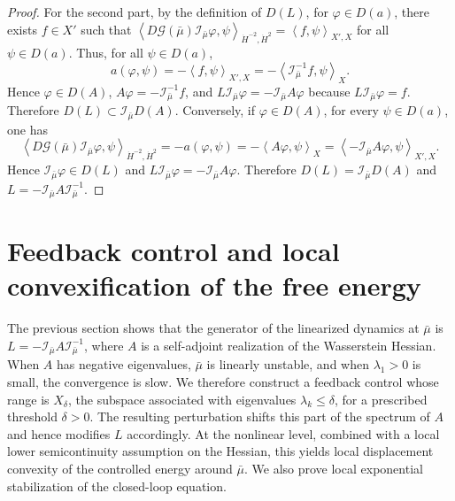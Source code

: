 \documentclass[11pt]{article}
\numberwithin{equation}{section}
\theoremstyle{definition}
\newcommand{\rieszmap}[1][\mu]{\mathcal{I}_{#1}}
\newcommand{\dotHk}[1][k]{\dot{H}^{#1}}
\begin{document}
\begin{proof}
    For the second part, by the definition of $D(L)$, for $\varphi \in D(a)$, there exists $f \in X'$ such that $\left\langle D\mathcal{G}(\bar\mu) \rieszmap[\bar\mu]\varphi, \psi \right\rangle_{\dot{H}^{-2}, \dotHk[2]} = \left\langle f, \psi \right\rangle_{X', X}$ for all $\psi \in D(a)$. 
    Thus, for all $\psi \in D(a)$, 
    \[
    a(\varphi, \psi) = -\left\langle f, \psi \right\rangle_{X', X} = -\left\langle \rieszmap[\bar\mu]^{-1} f, \psi \right\rangle_X.
    \]
    Hence $\varphi \in D(A)$, $A \varphi = -\rieszmap[\bar\mu]^{-1} f$, and $L \rieszmap[\bar\mu]\varphi = -\rieszmap[\bar\mu] A \varphi $ because $L\rieszmap[\bar\mu]\varphi = f$.
    Therefore $D(L) \subset \rieszmap[\bar\mu]D(A) $.
    Conversely, if $\varphi \in D(A)$, for every $\psi \in D(a)$, one has
    \begin{equation*}
        \left\langle D\mathcal{G}(\bar\mu) \rieszmap[\bar\mu]\varphi, \psi \right\rangle_{\dot{H}^{-2}, \dotHk[2]} = -a(\varphi, \psi) = -\left\langle A \varphi, \psi \right\rangle_X = \left\langle -\rieszmap[\bar\mu] A \varphi, \psi \right\rangle_{X', X}.
    \end{equation*}
    Hence $\rieszmap[\bar\mu]\varphi \in D(L)$ and $L \rieszmap[\bar\mu]\varphi = -\rieszmap[\bar\mu] A \varphi$. 
    Therefore $D(L) = \rieszmap[\bar\mu]D(A)$ and $L = -\rieszmap[\bar\mu] A \rieszmap[\bar\mu]^{-1}$.
\end{proof}

\section{Feedback control and local convexification of the free energy}
\label{sec:feedback}

The previous section shows that the generator of the linearized dynamics at $\bar\mu$ is $L = -\rieszmap[\bar\mu] A \rieszmap[\bar\mu]^{-1}$, where $A$ is a self-adjoint realization of the Wasserstein Hessian.
When $A$ has negative eigenvalues, $\bar\mu$ is linearly unstable, and when $\lambda_1 > 0$ is small, the convergence is slow.
We therefore construct a feedback control whose range is $X_\delta$, the subspace associated with eigenvalues $\lambda_k \le \delta$, for a prescribed threshold $\delta > 0$.
The resulting perturbation shifts this part of the spectrum of $A$ and hence modifies $L$ accordingly.
At the nonlinear level, combined with a local lower semicontinuity assumption on the Hessian, this yields local displacement convexity of the controlled energy around $\bar\mu$.
We also prove local exponential stabilization of the closed-loop equation.
\end{document}
